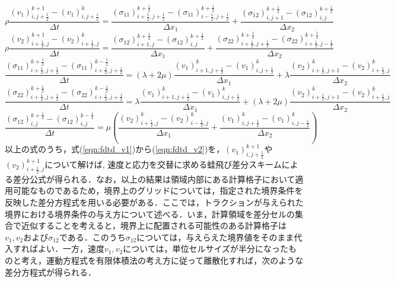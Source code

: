\begin{equation}
	\rho \frac{(v_1)_{i,j+\frac{1}{2}}^{k+1}-(v_1)^k_{i,j+\frac{1}{2}}}{\Delta t}
	=
	\frac{ 
		(\sigma_{11})^{k+\frac{1}{2}}_{i+\frac{1}{2},j+\frac{1}{2}}
		-(\sigma_{11})^{k+\frac{1}{2}}_{i-\frac{1}{2},j+\frac{1}{2}} 
	}
	{\Delta x_1}
	+
	\frac{(\sigma_{12})^{k+\frac{1}{2}}_{i,j+1}-(\sigma_{12})^{k+\frac{1}{2}}_{i,j}}{\Delta x_2}
	\label{eqn:fdtd_v1}
\end{equation}
\begin{equation}
	\rho \frac{(v_2)_{i+\frac{1}{2},j}^{k+1}-(v_2)^k_{i+\frac{1}{2},j}}{\Delta t}
	=
	\frac{(\sigma_{12})^{k+\frac{1}{2}}_{i+1,j}-(\sigma_{12})^{k+\frac{1}{2}}_{i,j}}{\Delta x_1}
	+
	\frac{ 
		(\sigma_{22})^{k+\frac{1}{2}}_{i+\frac{1}{2},j+\frac{1}{2}}
		-(\sigma_{22})^{k+\frac{1}{2}}_{i+\frac{1}{2},j-\frac{1}{2}} 
	}
	{\Delta x_2}
	\label{eqn:fdtd_v2}
\end{equation}
\begin{equation}
	\frac{
		 (\sigma_{11})^{k+\frac{1}{2}}_{i+\frac{1}{2},j+\frac{1}{2}}
		-
		 (\sigma_{11})^{k-\frac{1}{2}}_{i+\frac{1}{2},j+\frac{1}{2}}
	}
	{\Delta t}
	=
	\left( \lambda+2\mu \right)
	\frac{
		(v_1)^{k}_{i+1,j+\frac{1}{2}} - (v_1)^{k}_{i,j+\frac{1}{2}} 
	}
	{\Delta x_1}
	+
	\lambda
	\frac{
		(v_2)^{k}_{i+\frac{1}{2}, j+1} - (v_2)^{k}_{i+\frac{1}{2},j} 
	}
	{\Delta x_2}
	\label{eqn:fdtd_s11}
\end{equation}
\begin{equation}
	\frac{
		 (\sigma_{22})^{k+\frac{1}{2}}_{i+\frac{1}{2},j+\frac{1}{2}}
		-
		 (\sigma_{22})^{k-\frac{1}{2}}_{i+\frac{1}{2},j+\frac{1}{2}}
	}
	{\Delta t}
	=
	\lambda
	\frac{
		(v_1)^{k}_{i+1,j+\frac{1}{2}} - (v_1)^{k}_{i,j+\frac{1}{2}} 
	}
	{\Delta x_1}
	+
	\left( \lambda+2\mu \right)
	\frac{
		(v_2)^{k}_{i+\frac{1}{2}, j+1} - (v_2)^{k}_{i+\frac{1}{2},j} 
	}
	{\Delta x_2}
	\label{eqn:fdtd_s22}
\end{equation}
\begin{equation}
	\frac{
		 (\sigma_{12})^{k+\frac{1}{2}}_{i,j}
		-
		 (\sigma_{12})^{k-\frac{1}{2}}_{i,j}
	}
	{\Delta t}
	=
	\mu \left(
		\frac{
			(v_2)^{k}_{i+\frac{1}{2},j}
			-
			(v_2)^{k}_{i-\frac{1}{2},j}
		}
		{\Delta x_1}
		+
		\frac{
			(v_1)^{k}_{i,j+\frac{1}{2}}
			-
			(v_1)^{k}_{i,j-\frac{1}{2}}
		}
		{\Delta x_2}
	\right)	
	\label{eqn:fdtd_s12}
\end{equation}
以上の式のうち，式(\ref{eqn:fdtd_v1})から(\ref{eqn:fdtd_v2})を，$(v_1)^{k+1}_{i,j+\frac{1}{2}}$や$(v_2)^{k+1}_{i+\frac{1}{2},j}$について解けば, 速度と応力を交替に求める蛙飛び差分スキームによる差分公式が得られる．なお，以上の結果は領域内部にある計算格子において適用可能なものであるため，境界上のグリッドについては，指定された境界条件を反映した差分方程式を用いる必要がある．ここでは，トラクションが与えられた境界における境界条件の与え方について述べる．いま，計算領域を差分セルの集合で近似することを考えると，境界上に配置される可能性のある計算格子は$v_1, v_2$および$\sigma_{12}$である．このうち$\sigma_{12}$については，与えらえた境界値をそのまま代入すればよい．一方，速度$v_1, v_2$については，単位セルサイズが半分になったものと考え，運動方程式を有限体積法の考え方に従って離散化すれば，次のような差分方程式が得られる．
